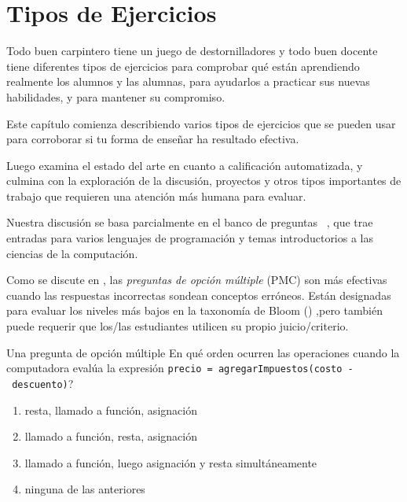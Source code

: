 \chapter{Tipos de Ejercicios}\label{s:exercises}

Todo buen carpintero tiene un juego de destornilladores y todo buen docente tiene diferentes tipos de ejercicios para comprobar qué están aprendiendo realmente los alumnos y las alumnas, para ayudarlos a practicar sus nuevas habilidades, y para mantener su  compromiso.

Este capítulo comienza describiendo varios tipos de ejercicios que se pueden usar para corroborar si tu forma de enseñar ha resultado efectiva.

Luego examina el estado del arte en cuanto a calificación automatizada, y culmina con la exploración de la discusión, proyectos y otros tipos importantes de trabajo que requieren una atención más humana para evaluar.

Nuestra discusión se basa parcialmente en el banco de preguntas ~\cite{Sand2013}, que trae entradas para varios lenguajes de programación y temas introductorios a las ciencias de la computación.


Como se discute en , las \emph{preguntas de opción múltiple} (PMC)  son más efectivas cuando las respuestas incorrectas sondean conceptos erróneos.  
Están designadas para evaluar los niveles más bajos en la taxonomía de Bloom
() ,pero también puede requerir que los/las estudiantes utilicen su propio juicio/criterio.

\begin{aside}{Una pregunta de opción múltiple}
  En qué orden ocurren las operaciones cuando la computadora evalúa la expresión \texttt{precio\ =\ agregarImpuestos(costo\ -\ descuento)}?
  \begin{enumerate}
  \item
    resta, llamado a función, asignación
  \item
    llamado a función, resta, asignación
  \item
    llamado a función, luego asignación y resta simultáneamente
  \item
    ninguna de las anteriores
  \end{enumerate}
\end{aside}


